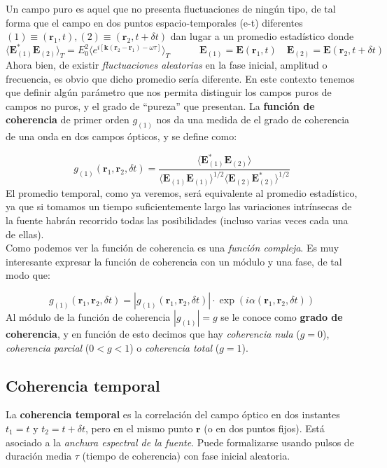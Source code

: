 \documentclass[12pt,a4paper]{book}
\numberwithin{equation}{section}
\numberwithin{figure}{section}
\newcommand{\tquad}{\quad \quad \quad}
\newcommand{\parentesis}[1]{\left( #1  \right)}
\newcommand{\1}{_{(1)}}
\newcommand{\2}{_{(2)}}
\newcommand{\rn}{\mathbf{r}}
\newcommand{\kn}{\mathbf{k}}
\newcommand{\En}{\mathbf{E}}
\theoremstyle{definition}
\begin{document}
Un campo puro es aquel que no presenta fluctuaciones de ningún tipo, de tal forma que el campo en dos puntos espacio-temporales (e-t) diferentes $(1)\equiv (\rn_1,t), (2)\equiv (\rn_2,t+\delta t)$ dan lugar a un promedio estadístico donde $$\langle \En_{(1)}^* \En_{(2)} \rangle_T = E_0^2 \langle  e^{i [\kn(\rn_2-\rn_1)-\omega \tau]} \rangle_T \tquad \En_{(1)}=\En (\rn_1,t) \quad \En_{(2)} = \En (\rn_2,t+\delta t)  $$ Ahora bien, de existir \textit{fluctuaciones aleatorias} en la fase inicial, amplitud o frecuencia, es obvio que dicho promedio sería diferente. En este contexto tenemos que definir algún parámetro que nos permita distinguir los campos puros de campos no puros, y el grado de ``pureza'' que presentan. La \textbf{función de coherencia} de primer orden $g_{(1)}$ nos da una medida de el grado de coherencia de una onda en dos campos ópticos, y se define como:

\begin{equation}
g_{(1)} (\rn_1,\rn_2,\delta t) = \frac{\langle \En_{(1)}^* \En\2 \rangle}{\langle \En\1\En\1 \rangle^{1/2}  \langle \En\2 \En\2^* \rangle^{1/2}} \label{Ec:02.04-1}
\end{equation} 
El promedio temporal, como ya veremos, será equivalente al promedio estadístico, ya que si tomamos un tiempo suficientemente largo las variaciones intrínsecas de la fuente habrán recorrido todas las posibilidades (incluso varias veces cada una de ellas). \\

Como podemos ver la función de coherencia es una \textit{función compleja}. Es muy interesante expresar la función de coherencia con un módulo y una fase, de tal modo que:

\begin{equation}
g_{(1)} (\rn_1,\rn_2,\delta t) = |g\1 (\rn_1,\rn_2,\delta t) | \cdot \exp  \parentesis{ i \alpha (\rn_1,\rn_2,\delta t)}
\end{equation}
Al módulo de la función de coherencia $|g\1|=g$ se le conoce como \textbf{grado de coherencia}, y en función de esto decimos que hay \textit{coherencia nula} ($g=0$), \textit{coherencia parcial} ($0 < g < 1$) o \textit{coherencia total} ($g=1$). \\

\subsection{Coherencia temporal}

La \textbf{coherencia temporal} es la correlación del campo óptico en dos instantes $t_1=t$ y $t_2=t+\delta t$, pero en el mismo punto $\rn$ (o en dos puntos fijos). Está asociado a la \textit{anchura espectral de la fuente}. Puede formalizarse usando pulsos de duración media $\tau$ (tiempo de coherencia) con fase inicial aleatoria. \\
\end{document}
